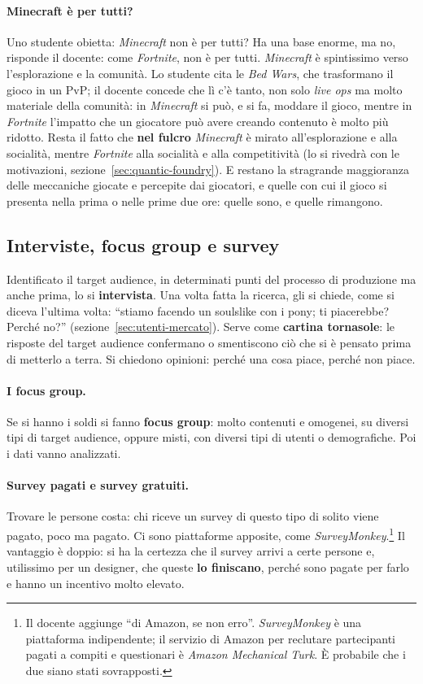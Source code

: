 \paragraph{Minecraft è per tutti?} Uno studente obietta: \emph{Minecraft} non
è per tutti? Ha una base enorme, ma no, risponde il docente: come
\emph{Fortnite}, non è per tutti. \emph{Minecraft} è spintissimo verso
l'esplorazione e la comunità. Lo studente cita le \emph{Bed Wars}, che
trasformano il gioco in un PvP; il docente concede che lì c'è tanto, non solo
\emph{live ops} ma molto materiale della comunità: in \emph{Minecraft} si
può, e si fa, moddare il gioco, mentre in \emph{Fortnite} l'impatto che un
giocatore può avere creando contenuto è molto più ridotto. Resta il fatto che
\textbf{nel fulcro} \emph{Minecraft} è mirato all'esplorazione e alla
socialità, mentre \emph{Fortnite} alla socialità e alla competitività (lo si
rivedrà con le motivazioni, sezione~\ref{sec:quantic-foundry}). E restano la
stragrande maggioranza delle meccaniche giocate e percepite dai giocatori, e
quelle con cui il gioco si presenta nella prima o nelle prime due ore: quelle
sono, e quelle rimangono.

\subsection{Interviste, focus group e survey}

Identificato il target audience, in determinati punti del processo di
produzione ma anche prima, lo si \textbf{intervista}. Una volta fatta la
ricerca, gli si chiede, come si diceva l'ultima volta: ``stiamo facendo un
soulslike con i pony; ti piacerebbe? Perché no?''
(sezione~\ref{sec:utenti-mercato}). Serve come \textbf{cartina tornasole}: le
risposte del target audience confermano o smentiscono ciò che si è pensato
prima di metterlo a terra. Si chiedono opinioni: perché una cosa piace,
perché non piace.

\paragraph{I focus group.} Se si hanno i soldi si fanno \textbf{focus group}:
molto contenuti e omogenei, su diversi tipi di target audience, oppure misti,
con diversi tipi di utenti o demografiche. Poi i dati vanno analizzati.

\paragraph{Survey pagati e survey gratuiti.} Trovare le persone costa: chi
riceve un survey di questo tipo di solito viene pagato, poco ma pagato. Ci
sono piattaforme apposite, come \emph{SurveyMonkey}.\footnote{Il docente
aggiunge ``di Amazon, se non erro''. \emph{SurveyMonkey} è una piattaforma
indipendente; il servizio di Amazon per reclutare partecipanti pagati a
compiti e questionari è \emph{Amazon Mechanical Turk}. È probabile che i due
siano stati sovrapposti.} Il vantaggio è doppio: si ha la certezza che il
survey arrivi a certe persone e, utilissimo per un designer, che queste
\textbf{lo finiscano}, perché sono pagate per farlo e hanno un incentivo
molto elevato.

